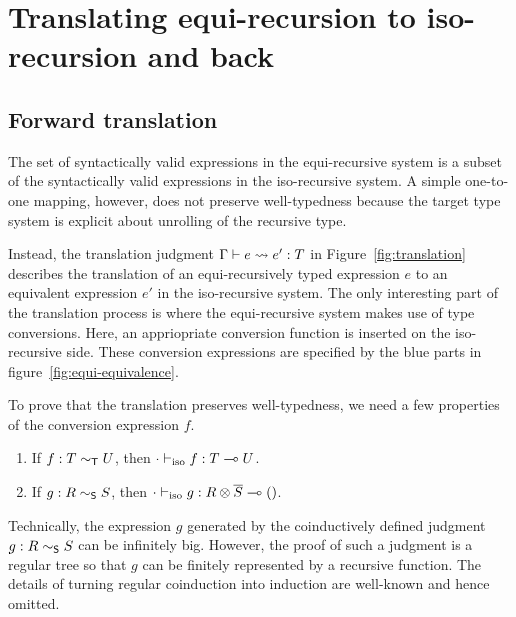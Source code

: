 \section{Translating equi-recursion to iso-recursion and back}

\subsection{Forward translation}
\label{sec:forward}


The set of syntactically valid expressions in the equi-recursive system is a
subset of the syntactically valid expressions in the iso-recursive system. A
simple one-to-one mapping, however, does not preserve well-typedness because
the target type system is explicit about unrolling of the recursive type.



Instead, the translation judgment $\translation e {e'} T$ in
Figure~\ref{fig:translation} describes the translation of an equi-recursively
typed expression $e$ to an equivalent expression $e'$ in the iso-recursive
system. The only interesting part of the translation process is where the
equi-recursive system makes use of type conversions. Here, an appriopriate
conversion function is inserted on the iso-recursive side. These
conversion expressions are specified by the blue parts in figure~\ref{fig:equi-equivalence}.
\begin{mathpar}
\end{mathpar}

To prove that the translation preserves well-typedness, we
need a few properties of the conversion expression $f$.
\begin{lemma}
  \begin{enumerate}
  \item If $f : T \eqt U$, then $\typing[\CNil]{\tyIso f}{\TFun TU}$.
  \item If $g : R \eqs S$, then $\typing[\CNil]{\tyIso g}{\TFun{\TPair
      R {\TDual S}} \TUnit}$.
  \end{enumerate}
\end{lemma}
Technically, the expression $g$ generated by the coinductively defined
judgment $g : R \eqs S$ can be infinitely big. However, the proof of
such a judgment is a regular tree so that $g$ can be finitely
represented by a recursive function. The details of turning regular
coinduction into induction are well-known
\cite{DBLP:conf/popl/HengleinN11,DBLP:journals/jfp/GapeyevLP02,DBLP:journals/lmcs/Dagnino21}
and hence omitted.

